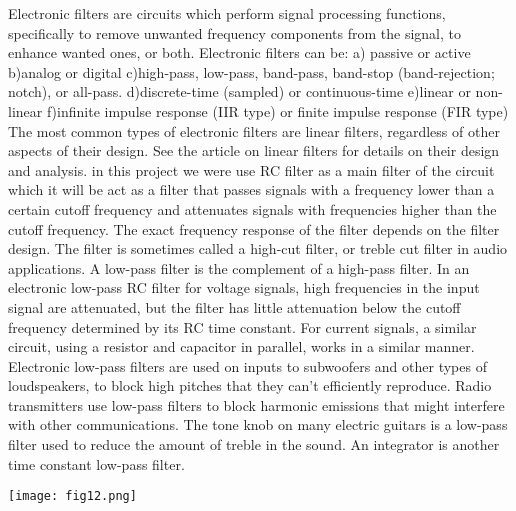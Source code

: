 \documentclass[11pt]{article}
\begin{document}
Electronic filters are circuits which perform signal processing functions, specifically to remove unwanted frequency components from the signal, to enhance wanted ones, or both. Electronic filters can be:\newline
 a) passive or active\newline
 b)analog or digital \newline
 c)high-pass, low-pass, band-pass, band-stop (band-rejection; notch), or all-pass.\newline
 d)discrete-time (sampled) or continuous-time\newline
 e)linear or non-linear\newline
 f)infinite impulse response (IIR type) or finite impulse response (FIR type)\newline
The most common types of electronic filters are linear filters, regardless of other aspects of their design. See the article on linear filters for details on their design and analysis.\newline
in this project we were use RC filter as a main filter of the circuit which it will be act as a filter that passes signals with a frequency lower than a certain cutoff frequency and attenuates signals with frequencies higher than the cutoff frequency. The exact frequency response of the filter depends on the filter design. The filter is sometimes called a high-cut filter, or treble cut filter in audio applications. A low-pass filter is the complement of a high-pass filter.\newline
In an electronic low-pass RC filter for voltage signals, high frequencies in the input signal are attenuated, but the filter has little attenuation below the cutoff frequency determined by its RC time constant. For current signals, a similar circuit, using a resistor and capacitor in parallel, works in a similar manner.
Electronic low-pass filters are used on inputs to subwoofers and other types of loudspeakers, to block high pitches that they can't efficiently reproduce. Radio transmitters use low-pass filters to block harmonic emissions that might interfere with other communications. The tone knob on many electric guitars is a low-pass filter used to reduce the amount of treble in the sound. An integrator is another time constant low-pass filter.\newline

\begin {center}
\texttt{[image: fig12.png]}\newline
\end{center}
\end{document}
